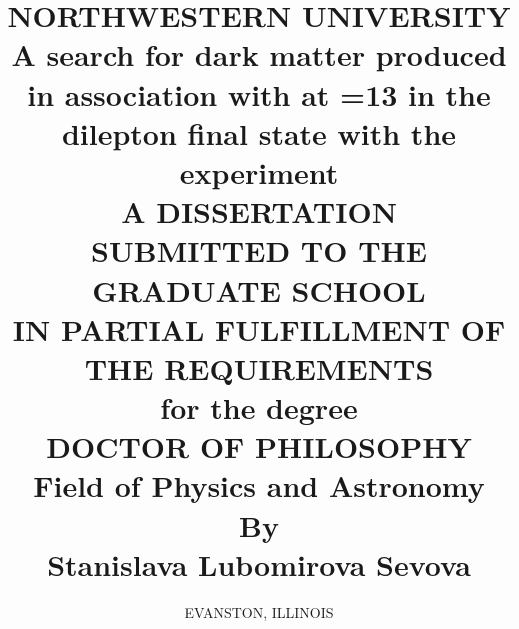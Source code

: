 \documentclass[hyperpdf,bindnopdf]{hepthesis}
\title{
  \normalsize
  \uppercase{Northwestern University} 
  \\
  \vspace{0.7 cm} 
  A search for dark matter produced in association with \ttbar at \sqrtS=\unit{13}{\TeV} in the dilepton final state with the \CMS experiment
  \\ 
  \vspace{0.7 cm}
  \uppercase{A Dissertation} \\
  \vspace{0.7 cm}
  \uppercase{Submitted to the graduate school \\ in partial fulfillment of the requirements} \\
  \vspace{0.7 cm}
  \small{for the degree} \\
  \vspace{0.7 cm}
  \uppercase{Doctor of Philosophy} \\
  \vspace{0.7 cm}
  Field of Physics and Astronomy \\
  \vspace{1.0 cm}
  By\\
  \vspace{0.3cm}
  Stanislava Lubomirova Sevova
}
\author{\normalsize \uppercase{Evanston, Illinois}}%
\begin{document}
\begin{frontmatter}
  
\end{frontmatter}

\begin{mainmatter}
  
  
  
  
\end{mainmatter}

\begin{appendices}
  
\end{appendices}

\begin{backmatter}
  
\end{backmatter}

\end{document}
